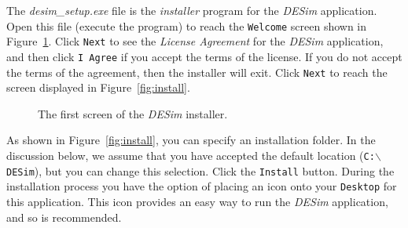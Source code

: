 \documentclass[11pt, twoside, pdftex]{article}
\begin{document}
The {\it desim\_setup.exe} file is the {\it installer} program for the {\it DESim}
application. Open this file (execute the program) to reach the \texttt{Welcome} screen 
shown in Figure~\ref{fig:welcome}. Click \texttt{Next} to see the {\it License Agreement}
for the {\it DESim} application, and then click \texttt{I Agree} if you accept the terms of 
the license. If you do not accept the terms of the agreement, then the installer will
exit. Click \texttt{Next} to reach the screen displayed in Figure~\ref{fig:install}.

\begin{figure}[h]
	\begin{center}
        \setlength{\fboxsep}{0pt}
	\end{center}
          \caption{The first screen of the {\it DESim} installer.}
	\label{fig:welcome}
\end{figure}

As shown in Figure~\ref{fig:install}, you can specify an installation folder. In the discussion
below, we assume that you have accepted the default location (\texttt{C:$\backslash$DESim}),
but you can change this selection. Click the \texttt{Install} button. 
During the installation process you have the option of placing an icon onto your
\texttt{Desktop} for this application. This icon provides an easy way to run the {\it DESim}
application, and so is recommended. 
\end{document}
